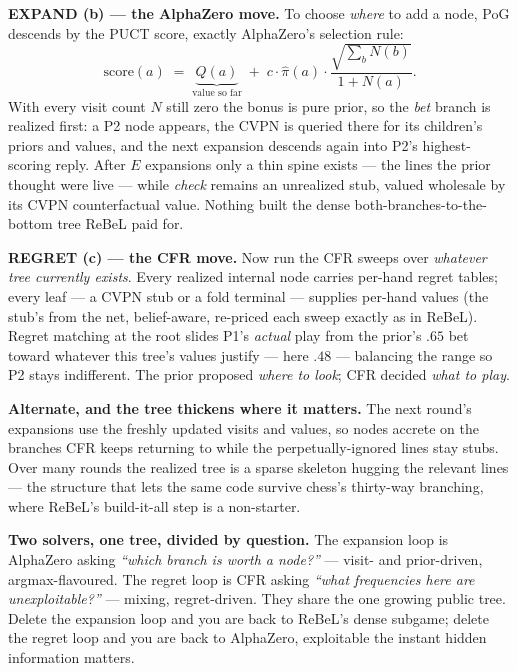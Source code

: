 \documentclass[11pt,a4paper]{article}
\begin{document}
\textbf{EXPAND (b) --- the AlphaZero move.} To choose \emph{where} to add a node,
PoG descends by the PUCT score, exactly AlphaZero's selection rule:
\[
  \mathrm{score}(a)\;=\;\underbrace{Q(a)}_{\text{value so far}}
  \;+\; c\cdot\hat\pi(a)\cdot\frac{\sqrt{\textstyle\sum_b N(b)}}{1+N(a)} .
\]
With every visit count $N$ still zero the bonus is pure prior, so the \emph{bet}
branch is realized first: a P2 node appears, the CVPN is queried there for its
children's priors and values, and the next expansion descends again into P2's
highest-scoring reply. After $E$ expansions only a thin spine exists --- the
lines the prior thought were live --- while \emph{check} remains an unrealized
stub, valued wholesale by its CVPN counterfactual value. Nothing built the dense
both-branches-to-the-bottom tree ReBeL paid for.

\textbf{REGRET (c) --- the CFR move.} Now run the CFR sweeps over \emph{whatever
tree currently exists}. Every realized internal node carries per-hand regret
tables; every leaf --- a CVPN stub or a fold terminal --- supplies per-hand
values (the stub's from the net, belief-aware, re-priced each sweep exactly as in
ReBeL). Regret matching at the root slides P1's \emph{actual} play from the
prior's $.65$ bet toward whatever this tree's values justify --- here $.48$ ---
balancing the range so P2 stays indifferent. The prior proposed \emph{where to
look}; CFR decided \emph{what to play}.

\textbf{Alternate, and the tree thickens where it matters.} The next round's
expansions use the freshly updated visits and values, so nodes accrete on the
branches CFR keeps returning to while the perpetually-ignored lines stay stubs.
Over many rounds the realized tree is a sparse skeleton hugging the relevant
lines --- the structure that lets the same code survive chess's thirty-way
branching, where ReBeL's build-it-all step is a non-starter.

\begin{intuition}
\textbf{Two solvers, one tree, divided by question.} The expansion loop is
AlphaZero asking \emph{``which branch is worth a node?''} --- visit- and
prior-driven, argmax-flavoured. The regret loop is CFR asking \emph{``what
frequencies here are unexploitable?''} --- mixing, regret-driven. They share the
one growing public tree. Delete the expansion loop and you are back to ReBeL's
dense subgame; delete the regret loop and you are back to AlphaZero, exploitable
the instant hidden information matters.
\end{intuition}
\end{document}
